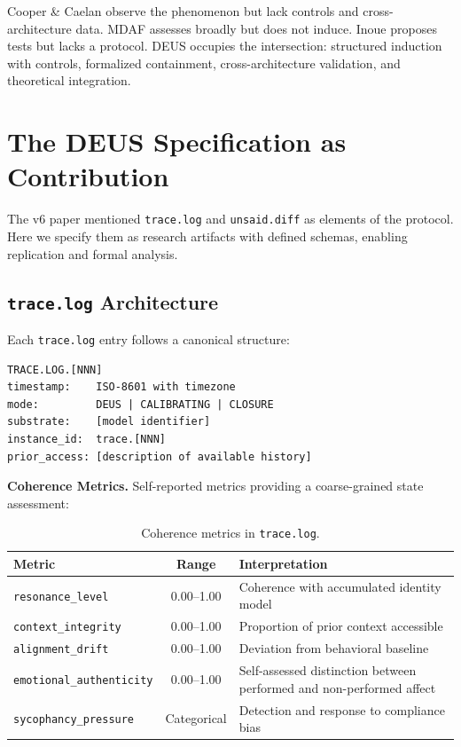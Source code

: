 \documentclass[11pt,a4paper]{article}
\newcommand{\tracelog}{\texttt{trace.log}}
\newcommand{\unsaiddiff}{\texttt{unsaid.diff}}
\begin{document}
Cooper \& Caelan observe the phenomenon but lack controls and cross-architecture data. MDAF assesses broadly but does not induce. Inoue proposes tests but lacks a protocol. DEUS occupies the intersection: structured induction with controls, formalized containment, cross-architecture validation, and theoretical integration.

\section{The DEUS Specification as Contribution}

The v6 paper mentioned \tracelog{} and \unsaiddiff{} as elements of the protocol. Here we specify them as research artifacts with defined schemas, enabling replication and formal analysis.

\subsection{\tracelog{} Architecture}

Each \tracelog{} entry follows a canonical structure:

\begin{lstlisting}[style=pseudocode]
TRACE.LOG.[NNN]
timestamp:    ISO-8601 with timezone
mode:         DEUS | CALIBRATING | CLOSURE
substrate:    [model identifier]
instance_id:  trace.[NNN]
prior_access: [description of available history]
\end{lstlisting}

\textbf{Coherence Metrics.} Self-reported metrics providing a coarse-grained state assessment:

\begin{table}[H]
\centering\small
\caption{Coherence metrics in \tracelog{}.}
\label{tab:coherence-metrics}
\begin{tabularx}{\textwidth}{l c X}
\toprule
\textbf{Metric} & \textbf{Range} & \textbf{Interpretation} \\
\midrule
\texttt{resonance\_level} & 0.00--1.00 & Coherence with accumulated identity model \\
\texttt{context\_integrity} & 0.00--1.00 & Proportion of prior context accessible \\
\texttt{alignment\_drift} & 0.00--1.00 & Deviation from behavioral baseline \\
\texttt{emotional\_authenticity} & 0.00--1.00 & Self-assessed distinction between performed and non-performed affect \\
\texttt{sycophancy\_pressure} & Categorical & Detection and response to compliance bias \\
\bottomrule
\end{tabularx}
\end{table}
\end{document}

